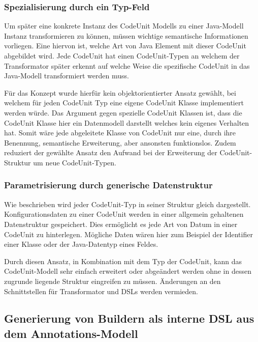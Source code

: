 \documentclass[12pt,oneside,a4paper,parskip]{scrbook}
\begin{document}
\subsubsection{Spezialisierung durch ein Typ-Feld}

Um später eine konkrete Instanz des CodeUnit Modells zu einer Java-Modell Instanz transformieren zu können, müssen wichtige semantische Informationen vorliegen. Eine hiervon ist, welche Art von Java Element mit dieser CodeUnit abgebildet wird. Jede CodeUnit hat einen CodeUnit-Typen an welchem der Transformator später erkennt auf welche Weise die spezifische CodeUnit in das Java-Modell transformiert werden muss.

Für das Konzept wurde hierfür kein objektorientierter Ansatz gewählt, bei welchem für jeden CodeUnit Typ eine eigene CodeUnit Klasse implementiert werden würde. Das Argument gegen spezielle CodeUnit Klassen ist, dass die CodeUnit Klasse hier ein Datenmodell darstellt welches kein eigenes Verhalten hat. Somit wäre jede abgeleitete Klasse von CodeUnit nur eine, durch ihre Benennung, semantische Erweiterung, aber ansonsten funktionslos. Zudem reduziert der gewählte Ansatz den Aufwand bei der Erweiterung der CodeUnit-Struktur um neue CodeUnit-Typen.

\subsubsection{Parametrisierung durch generische Datenstruktur}

Wie beschrieben wird jeder CodeUnit-Typ in seiner Struktur gleich dargestellt. Konfigurationsdaten zu einer CodeUnit werden in einer allgemein gehaltenen Datenstruktur gespeichert. Dies ermöglicht es jede Art von Datum in einer CodeUnit zu hinterlegen. Mögliche Daten wären hier zum Beispiel der Identifier einer Klasse oder der Java-Datentyp eines Feldes.

Durch diesen Ansatz, in Kombination mit dem Typ der CodeUnit, kann das CodeUnit-Modell sehr einfach erweitert oder abgeändert werden ohne in dessen zugrunde liegende Struktur eingreifen zu müssen. Änderungen an den Schnittstellen für Transformator und DSLs werden vermieden.

\subsection{Generierung von Buildern als interne DSL aus dem Annotations-Modell}
\end{document}
